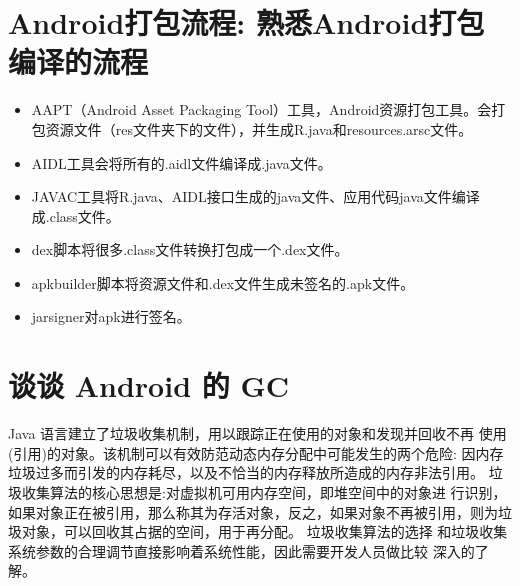 \documentclass[9pt, b5paper]{article}
\begin{document}
\section{Android打包流程: 熟悉Android打包编译的流程}
\label{sec-12}
\begin{itemize}
\item AAPT（Android Asset Packaging Tool）工具，Android资源打包工具。会打包资源文件（res文件夹下的文件），并生成R.java和resources.arsc文件。
\item AIDL工具会将所有的.aidl文件编译成.java文件。
\item JAVAC工具将R.java、AIDL接口生成的java文件、应用代码java文件编译成.class文件。
\item dex脚本将很多.class文件转换打包成一个.dex文件。
\item apkbuilder脚本将资源文件和.dex文件生成未签名的.apk文件。
\item jarsigner对apk进行签名。
\end{itemize}
\section{谈谈 Android 的 GC}
\label{sec-13}
Java 语言建立了垃圾收集机制，用以跟踪正在使用的对象和发现并回收不再 使用(引用)的对象。该机制可以有效防范动态内存分配中可能发生的两个危险: 因内存垃圾过多而引发的内存耗尽，以及不恰当的内存释放所造成的内存非法引用。
垃圾收集算法的核心思想是:对虚拟机可用内存空间，即堆空间中的对象进 行识别，如果对象正在被引用，那么称其为存活对象，反之，如果对象不再被引用，则为垃圾对象，可以回收其占据的空间，用于再分配。
垃圾收集算法的选择 和垃圾收集系统参数的合理调节直接影响着系统性能，因此需要开发人员做比较 深入的了解。
\end{document}
